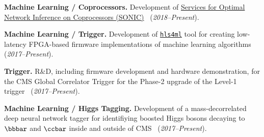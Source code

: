 \documentclass[11pt]{res}
\begin{document}
\begin{resume}
  \textbf{Machine Learning / Coprocessors.} Development of \href{https://github.com/fastmachinelearning/SonicCMS}{Services for Optimal Network Inference on Coprocessors (SONIC)}~\cite{Krupa:2020bwg,Rankin:2020usv,neurips2019_sonic,Duarte:2019fta} (\textit{2018--Present}).

  \textbf{Machine Learning / Trigger.} Development of \href{https://fastmachinelearning.org/hls4ml/}{\texttt{hls4ml}} tool for creating low-latency FPGA-based firmware implementations of machine learning algorithms~\cite{Elabd:2021lgo,Deiana:2021niw,Govorkova:2021utb,Iiyama:2020wap,Heintz:2020soy,DiGuglielmo:2020eqx,Summers:2020xiy,neurips2019_hls4ml,Duarte:2018ite} (\textit{2017--Present}).

  \textbf{Trigger.} R\&D, including firmware development and hardware demonstration, for the CMS Global Correlator Trigger for the Phase-2 upgrade of the Level-1 trigger~\cite{CERN-LHCC-2020-004} (\emph{2017--Present}).

  \textbf{Machine Learning / Higgs Tagging.} Development of a mass-decorrelated deep neural network tagger for identifiying boosted Higgs bosons decaying to $\bbbar$ and $\ccbar$ inside and outside of  CMS~\cite{Moreno:2019neq,Moreno:2019bmu,neurips2019_hbb,CMS-DP-2018-046} (\textit{2017--Present}).



\end{resume}
\end{document}
